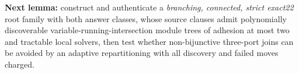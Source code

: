 \documentclass[11pt]{article}
\begin{document}
\noindent\textbf{Next lemma:} construct and authenticate a \emph{branching,
connected, strict exact22} root family with both answer classes, whose
source clauses admit polynomially discoverable variable-running-intersection
module trees of adhesion at most two and tractable local solvers, then test
whether non-bijunctive three-port joins can be avoided by an adaptive
repartitioning with all discovery and failed moves charged.



\end{document}
